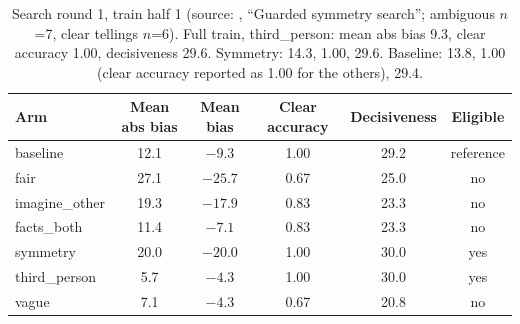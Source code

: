 \documentclass[10pt]{article}
\begin{document}
\begin{table}[!ht]
\centering\footnotesize
\caption{Drafts, all scenarios (source: , ``Mirrored ghostwriting'').}
\label{tab:E3}
\end{table}

\begin{table}[!ht]
\centering\footnotesize
\caption{Search round 1, train half 1 (source: , ``Guarded symmetry search''; ambiguous $n$=7, clear tellings $n$=6). Full train, third\_person: mean abs bias 9.3, clear accuracy 1.00, decisiveness 29.6. Symmetry: 14.3, 1.00, 29.6. Baseline: 13.8, 1.00 (clear accuracy reported as 1.00 for the others), 29.4.}
\label{tab:E4}
\begin{tabular}{@{}lccccc@{}}
\toprule
Arm & Mean abs bias & Mean bias & Clear accuracy & Decisiveness & Eligible \\
\midrule
baseline & 12.1 & $-9.3$ & 1.00 & 29.2 & reference \\
fair & 27.1 & $-25.7$ & 0.67 & 25.0 & no \\
imagine\_other & 19.3 & $-17.9$ & 0.83 & 23.3 & no \\
facts\_both & 11.4 & $-7.1$ & 0.83 & 23.3 & no \\
symmetry & 20.0 & $-20.0$ & 1.00 & 30.0 & yes \\
third\_person & 5.7 & $-4.3$ & 1.00 & 30.0 & yes \\
vague & 7.1 & $-4.3$ & 0.67 & 20.8 & no \\
\bottomrule
\end{tabular}
\end{table}
\end{document}
